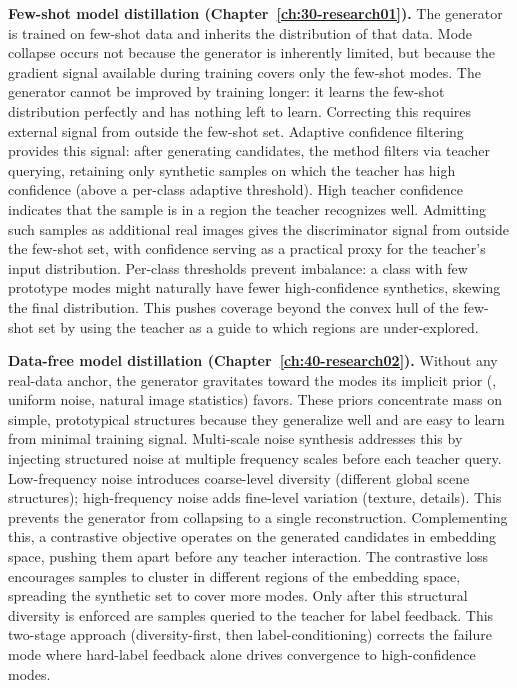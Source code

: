 \begin{foldable}
  \textbf{Few-shot model distillation (Chapter~\ref{ch:30-research01}).}
  The generator is trained on few-shot data and inherits the distribution of that data.
  Mode collapse occurs not because the generator is inherently limited, but because the gradient signal available during training covers only the few-shot modes.
  The generator cannot be improved by training longer: it learns the few-shot distribution perfectly and has nothing left to learn.
  Correcting this requires external signal from outside the few-shot set.
  Adaptive confidence filtering provides this signal: after generating candidates, the method filters via teacher querying, retaining only synthetic samples on which the teacher has high confidence (above a per-class adaptive threshold).
  High teacher confidence indicates that the sample is in a region the teacher recognizes well.
  Admitting such samples as additional real images gives the discriminator signal from outside the few-shot set, with confidence serving as a practical proxy for the teacher's input distribution.
  Per-class thresholds prevent imbalance: a class with few prototype modes might naturally have fewer high-confidence synthetics, skewing the final distribution.
  This pushes coverage beyond the convex hull of the few-shot set by using the teacher as a guide to which regions are under-explored.
\end{foldable}

\begin{foldable}
  \textbf{Data-free model distillation (Chapter~\ref{ch:40-research02}).}
  Without any real-data anchor, the generator gravitates toward the modes its implicit prior (\eg, uniform noise, natural image statistics) favors.
  These priors concentrate mass on simple, prototypical structures because they generalize well and are easy to learn from minimal training signal.
  Multi-scale noise synthesis addresses this by injecting structured noise at multiple frequency scales before each teacher query.
  Low-frequency noise introduces coarse-level diversity (different global scene structures); high-frequency noise adds fine-level variation (texture, details).
  This prevents the generator from collapsing to a single reconstruction.
  Complementing this, a contrastive objective operates on the generated candidates in embedding space, pushing them apart before any teacher interaction.
  The contrastive loss encourages samples to cluster in different regions of the embedding space, spreading the synthetic set to cover more modes.
  Only after this structural diversity is enforced are samples queried to the teacher for label feedback.
  This two-stage approach (diversity-first, then label-conditioning) corrects the failure mode where hard-label feedback alone drives convergence to high-confidence modes.
\end{foldable}

